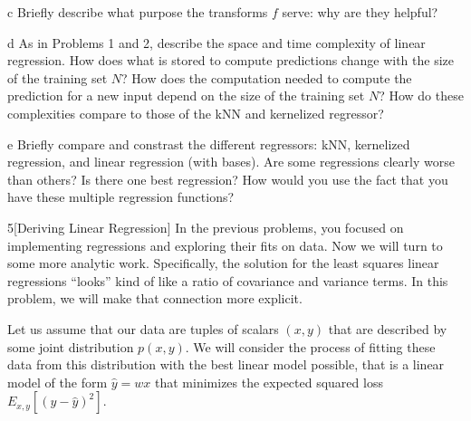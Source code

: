 \documentclass[expanded]{pset}
\begin{document}
\begin{parts}
  \begin{part}{c}
    Briefly describe what purpose the transforms $f$ serve: why are they helpful?
  \end{part}

  \begin{part}{d}
    As in Problems 1 and 2, describe the space and time complexity of linear regression.  How does what is stored to compute predictions change with the size of the training set $N$?  How does the computation needed to compute the prediction for a new input depend on the size of the training set $N$?  How do these complexities compare to those of the kNN and kernelized regressor?
  \end{part}

  \begin{part}{e}
    Briefly compare and constrast the different regressors: kNN,
    kernelized regression, and linear regression (with bases).  Are some
    regressions clearly worse than others?  Is there one best
    regression?  How would you use the fact that you have these multiple
    regression functions?
  \end{part}

\end{parts}

\begin{problem}{5}[Deriving Linear Regression]
  In the previous problems, you focused on implementing regressions
  and exploring their fits on data. Now we will turn to some more
  analytic work.  Specifically, the solution for the least squares
  linear regressions ``looks'' kind of like a ratio of covariance and
  variance terms.  In this problem, we will make that connection more
  explicit.

  \medskip
  Let us assume that our data are tuples of scalars $(x,y)$ that are
  described by some joint distribution $p(x,y)$. We will consider the process of fitting these data from this distribution with the best linear model
  possible, that is a linear model of the form $\hat{y} = wx$ that
  minimizes the expected squared loss $E_{x,y}[ ( y - \hat{y} )^2
  ]$.
\end{problem}
  
\end{document}
